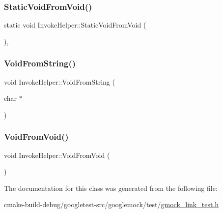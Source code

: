 \subsubsection{\texorpdfstring{StaticVoidFromVoid()}{StaticVoidFromVoid()}}
{\footnotesize\ttfamily static void Invoke\+Helper\+::\+Static\+Void\+From\+Void (\begin{DoxyParamCaption}{ }\end{DoxyParamCaption})\hspace{0.3cm}{\ttfamily [inline]}, {\ttfamily [static]}}

\mbox{\label{classInvokeHelper_a89f02dc384e6b5a7d935b7ea0a81cc9e}} 
\subsubsection{\texorpdfstring{VoidFromString()}{VoidFromString()}}
{\footnotesize\ttfamily void Invoke\+Helper\+::\+Void\+From\+String (\begin{DoxyParamCaption}\item[{char $\ast$}]{ }\end{DoxyParamCaption})\hspace{0.3cm}{\ttfamily [inline]}}

\mbox{\label{classInvokeHelper_a6371bcb64a8f01093f6fdef60776a031}} 
\subsubsection{\texorpdfstring{VoidFromVoid()}{VoidFromVoid()}}
{\footnotesize\ttfamily void Invoke\+Helper\+::\+Void\+From\+Void (\begin{DoxyParamCaption}{ }\end{DoxyParamCaption})\hspace{0.3cm}{\ttfamily [inline]}}



The documentation for this class was generated from the following file\+:\begin{DoxyCompactItemize}
\item 
cmake-\/build-\/debug/googletest-\/src/googlemock/test/\mbox{\hyperlink{gmock__link__test_8h}{gmock\+\_\+link\+\_\+test.\+h}}\end{DoxyCompactItemize}
